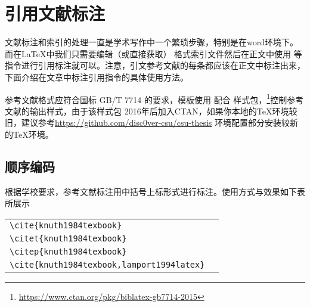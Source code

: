 
\chapter{引用文献标注}

文献标注和索引的处理一直是学术写作中一个繁琐步骤，特别是在word环境下。而在\LaTeX 中我们只需要编辑（或直接获取） \BibLaTeX 格式索引文件然后在正文中使用 等指令进行引用标注就可以。注意，引文参考文献的每条都应该在正文中标注出来\cite{knuth1984texbook,__2011,__2014,__2015,__2016,__2017,_lpr_2019,_lpr_2020,_lpr_2020-1,_lpr_2020-2,_lpr_2021,balakrishnan_corfu_2012,balakrishnan_tango_2013,balakrishnan_virtual_2020,cidon_copysets_2013,csu__2020,ding_scalog_2020,hartman_zebra_1993,jia_boki_2021,kalia_design_2016,knuth1984texbook,lamport1994latex,lockerman_fuzzylog_2018,mehdi_i_2017,Pawlak1982Rough,pritchard1969statistical,wei_vcorfu_2017}，下面介绍在文章中标注引用指令的具体使用方法。

参考文献格式应符合国标 GB/T 7714 的要求，模板使用 \BibLaTeX 配合  样式包，\footnote{\url{https://www.ctan.org/pkg/biblatex-gb7714-2015}}控制参考文献的输出样式，由于该样式包 2016年后加入CTAN，如果你本地的\TeX 环境较旧，建议参考\url{https://github.com/disc0ver-csu/csu-thesis} 环境配置部分安装较新的\TeX 环境。

\section{顺序编码}

根据学校要求，参考文献标注用中括号上标形式进行标注。使用方式与效果如下表所展示

\begin{tabular}{l@{\quad$\Rightarrow$\quad}l}
    \verb|\cite{knuth1984texbook}|               & \cite{knuth1984texbook}               \\
    \verb|\citet{knuth1984texbook}|              & \citet{knuth1984texbook}              \\
    \verb|\citep{knuth1984texbook}|              & \citep{knuth1984texbook}              \\
    \verb|\cite{knuth1984texbook,lamport1994latex}| & \cite{knuth1984texbook,lamport1994latex} \\
\end{tabular}

